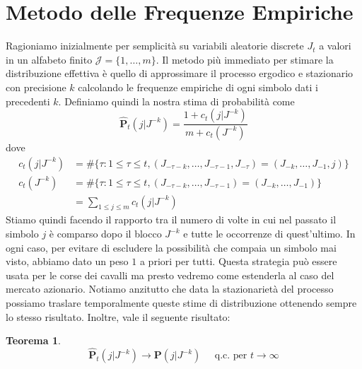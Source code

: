 \documentclass[a4paper,11pt]{book}
\theoremstyle{plain}
\newtheorem{teo}{Teorema}[chapter]
\theoremstyle{definition}
\theoremstyle{remark}
\newcommand{\Pro}{\mathbf{P}}
\newcommand{\Ph}{\hat{\mathbf{P}}}
\begin{document}
\section{Metodo delle Frequenze Empiriche}\label{Metfreq}
Ragioniamo inizialmente per semplicità su variabili aleatorie discrete $J_t$ a valori in un alfabeto finito $\mathcal{J}=\{1,\ldots, m\}$. Il metodo più immediato per stimare la distribuzione effettiva è quello di approssimare il processo ergodico e stazionario con precisione $k$ calcolando le frequenze empiriche di ogni simbolo dati i precedenti $k$. Definiamo quindi la nostra stima di probabilità come 
\begin{equation}\label{empirical}
	\Ph_t(j|J^{-k})=\frac{1+c_t(j|J^{-k})}{m+c_t(J^{-k})}
\end{equation}
dove 
\begin{equation*}
	\begin{split}
	c_t(j|J^{-k})&=\#\{\tau: 1\leq \tau \leq t, (J_{-\tau-k},\ldots, J_{-\tau-1}, J_{-\tau})=(J_{-k},\ldots,J_{-1},j)\}\\
	c_t(J^{-k}) & =\#\{\tau:1 \leq \tau \leq t, (J_{-\tau-k},\ldots, J_{-\tau-1})=(J_{-k},\ldots,J_{-1})\}\\
	& = \sum_{1\leq j\leq m}{c_t(j|J^{-k})}
	\end{split}
\end{equation*}
Stiamo quindi facendo il rapporto tra il numero di volte in cui nel passato il simbolo $j$ è comparso dopo il blocco $J^{-k}$ e tutte le occorrenze di quest'ultimo. In ogni caso, per evitare di escludere la possibilità che compaia un simbolo mai visto, abbiamo dato un peso $1$ a priori per tutti.\newline
Questa strategia può essere usata per le corse dei cavalli ma presto vedremo come estenderla al caso del mercato azionario.\newline
Notiamo anzitutto che data la stazionarietà del processo possiamo traslare temporalmente queste stime di distribuzione ottenendo sempre lo stesso risultato. Inoltre, vale il seguente risultato:
\begin{teo}
	\begin{equation*}
		\Ph_t(j|J^{-k})\rightarrow\Pro(j|J^{-k}) \;\;\;\;\; \text{q.c. per } t\to\infty
	\end{equation*}
\end{teo}
\end{document}

